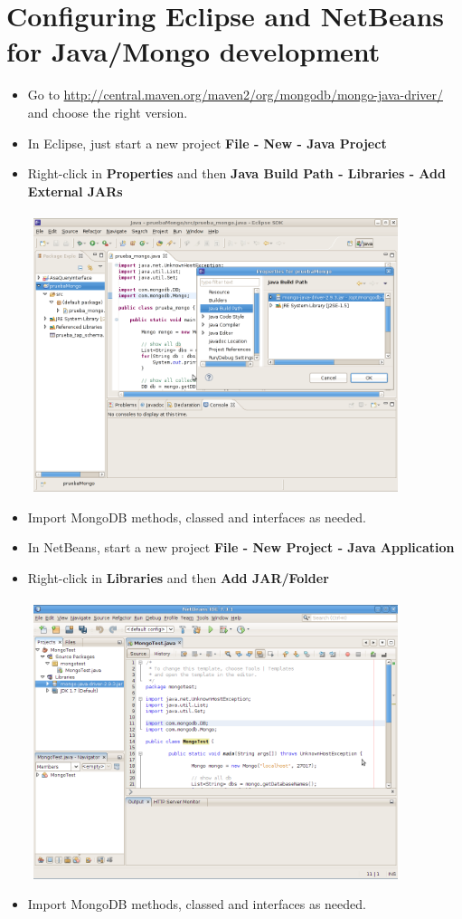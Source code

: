 \chapter{Configuring Eclipse and NetBeans for Java/Mongo development}

\begin{itemize}
\item Go to \url{http://central.maven.org/maven2/org/mongodb/mongo-java-driver/} and choose the right version.
\item In Eclipse, just start a new project \textbf{File - New - Java Project}
\item Right-click in \textbf{Properties} and then \textbf{Java Build Path - Libraries - Add External JARs}\\ 
\\ \includegraphics[width=11cm,height=8cm]{images/mongo_eclipse.png}
\item Import MongoDB methods, classed and interfaces as needed.
\item In NetBeans, start a new project \textbf{File - New Project - Java Application}
\item Right-click in \textbf{Libraries} and then \textbf{Add JAR/Folder} \\
\\ \includegraphics[width=11cm,height=8cm]{images/mongo_netbeans.png}
\item Import MongoDB methods, classed and interfaces as needed.
\end{itemize}
